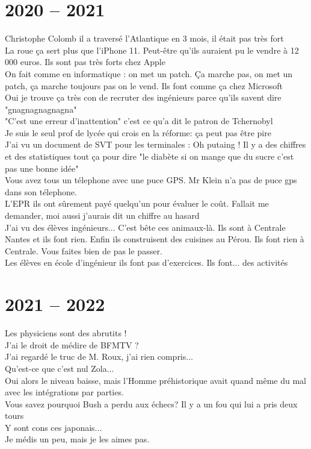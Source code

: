 \documentclass[french, a4paper, openany]{book}
\begin{document}
\section{2020 -- 2021}

	\noindent \og Christophe Colomb il a traversé l'Atlantique en 3 mois, il était pas très fort \fg \\
	\og La roue ça sert plus que l'iPhone 11. Peut-être qu'ils auraient pu le vendre à 12 000 euros. Ils sont pas très forts chez Apple \fg \\
	\og On fait comme en informatique : on met un patch. Ça marche pas, on met un patch, ça marche toujours pas on le vend. Ils font comme ça chez Microsoft \fg \\
	\og Oui je trouve ça très con de recruter des ingénieurs parce qu'ils savent dire "gnagnagnagnagna" \fg \\
	\og "C'est une erreur d'inattention" c'est ce qu'a dit le patron de Tchernobyl \fg \\
	\og Je suis le seul prof de lycée qui crois en la réforme: ça peut pas être pire \fg \\
	\og J'ai vu un document de SVT pour les terminales : Oh putaing ! Il y a des chiffres et des statistiques tout ça pour dire "le diabète si on mange que du sucre c'est pas une bonne idée" \fg \\
	\og Vous avez tous un télephone avec une puce GPS. Mr Klein n'a pas de puce gps dans son télephone. \fg \\
	\og L'EPR ils ont sûrement payé quelqu'un pour évaluer le coût. Fallait me demander, moi aussi j'aurais dit un chiffre au hasard \fg \\
	\og J'ai vu des élèves ingénieurs... C'est bête ces animaux-là. Ils sont à Centrale Nantes et ils font rien. Enfin ils construisent des cuisines au Pérou. Ils font rien à Centrale. Vous faites bien de pas le passer. \fg \\
	\og Les élèves en école d'ingénieur ils font pas d'exercices. Ils font... des activités \fg \\

\section{2021 -- 2022}

	\noindent \og Les physiciens sont des abrutits ! \fg \\
	\og J'ai le droit de médire de BFMTV ? \fg \\
	\og J'ai regardé le truc de M. Roux, j'ai rien compris... \fg \\
	\og Qu'est-ce que c'est nul Zola... \fg \\
	\og Oui alors le niveau baisse, mais l'Homme préhistorique avait quand même du mal avec les intégrations par parties. \fg \\
	\og Vous savez pourquoi Bush a perdu aux échecs? Il y a un fou qui lui a pris deux tours \fg \\
	\og Y sont cons ces japonais... \fg \\
	\og Je médis un peu, mais je les aimes pas. \fg \\
\end{document}
